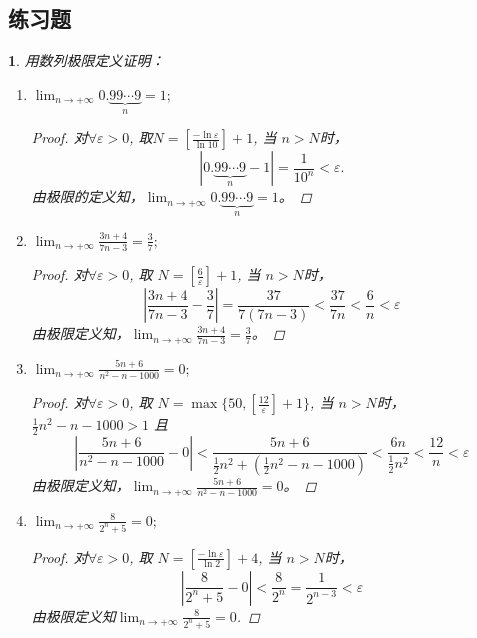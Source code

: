 \documentclass[utf8]{book}
\newtheorem{example}{}[section]             %
\begin{document}
\subsection{练习题}
\begin{example}用数列极限定义证明：
\renewcommand\labelenumi{\normalfont(\theenumi)}
\begin{enumerate}
        \item $\displaystyle \lim_{n\to +\infty} 0.\underbrace{99\cdots9}_{n} = 1;$
        \begin{proof}
        对$\forall \varepsilon > 0$, 取$N = \left [ \frac{-\ln\varepsilon}{\ln 10}\right ] + 1$, 当 $n > N$时，
        $$\left | 0.\underbrace{99\cdots9}_{n} - 1\right | = \frac{1}{10^n} < \varepsilon.$$
        由极限的定义知，$\displaystyle\lim_{n\to +\infty} 0.\underbrace{99\cdots9}_{n} = 1$。
        \end{proof}
        
        \item $\displaystyle \lim_{n\to +\infty}\frac{3n+4}{7n-3} = \frac{3}{7};$
        \begin{proof}
        对$\forall \varepsilon > 0$, 取 $N = \left [ \frac{6}{\varepsilon}\right ] + 1$, 当 $n > N$时，
        $$\left | \frac{3n+4}{7n-3} - \frac{3}{7}\right | = \frac{37}{7(7n-3)} < \frac{37}{7n} < \frac{6}{n} < \varepsilon$$
        由极限定义知，$\displaystyle\lim_{n\to +\infty}\frac{3n+4}{7n-3} = \frac{3}{7}$。
        \end{proof}
        
        \item $\displaystyle \lim_{n\to +\infty}\frac{5n+6}{n^2-n-1000} = 0;$
        \begin{proof}
        对$\forall \varepsilon > 0$, 取 $N = \max\{50, \left [ \frac{12}{\varepsilon}\right ] + 1\}$, 当 $n > N$时，$\frac{1}{2}n^2 - n - 1000 > 1$ 且
        $$\left | \frac{5n+6}{n^2-n-1000} - 0\right | < \frac{5n + 6}{\frac{1}{2}n^2 + (\frac{1}{2}n^2 - n - 1000)} < \frac{6n}{\frac{1}{2}n^2} < \frac{12}{n} < \varepsilon$$
        由极限定义知，$\displaystyle\lim_{n\to +\infty}\frac{5n+6}{n^2-n-1000} = 0$。  
        \end{proof}
        
        \item $\displaystyle \lim_{n\to +\infty}\frac{8}{2^n+5} = 0;$
        \begin{proof}
         对$\forall \varepsilon > 0$, 取 $N = \left [ \frac{-\ln\varepsilon}{\ln2}\right ] + 4$, 当 $n > N$时，
        $$\left | \frac{8}{2^n+5} - 0\right | < \frac{8}{2^n} = \frac{1}{2^{n-3}} < \varepsilon$$
        由极限定义知$\lim_{n\to +\infty}\frac{8}{2^n+5} = 0$.  
        \end{proof}
        

\end{enumerate}
\end{example}
\end{document}

